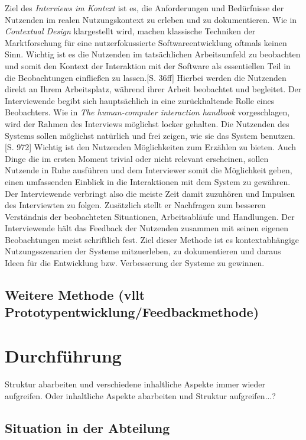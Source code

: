 \documentclass[12pt]{article}
\begin{document}
Ziel des \textit{Interviews im Kontext} ist es, die Anforderungen und
Bedürfnisse der Nutzenden im realen Nutzungskontext zu erleben und zu
dokumentieren. Wie in \textit{Contextual Design} klargestellt wird, machen
klassische Techniken der Marktforschung für eine nutzerfokussierte
Softwareentwicklung oftmals keinen Sinn. Wichtig ist es die Nutzenden im
tatsächlichen Arbeitsumfeld zu beobachten und somit den Kontext der Interaktion
mit der Software als essentiellen Teil in die Beobachtungen einfließen zu
lassen.\cite{contextualDesign}[S. 36ff] Hierbei werden die Nutzenden direkt an
Ihrem Arbeitsplatz, während ihrer Arbeit beobachtet und begleitet. Der
Interviewende begibt sich hauptsächlich in eine zurückhaltende Rolle eines
Beobachters. Wie in \textit{The human-computer interaction handbook}
vorgeschlagen, wird der Rahmen des Interviews möglichst locker gehalten. Die
Nutzenden des Systems sollen möglichst natürlich und frei zeigen, wie sie das
System benutzen.\cite{hciHandbook}[S. 972] Wichtig ist den Nutzenden
Möglichkeiten zum Erzählen zu bieten. Auch Dinge die im ersten Moment trivial
oder nicht relevant erscheinen, sollen Nutzende in Ruhe ausführen und dem
Interviewer somit die Möglichkeit geben, einen umfassenden Einblick in die
Interaktionen mit dem System zu gewähren. Der Interviewende verbringt also die
meiste Zeit damit zuzuhören und Impulsen des Interviewten zu folgen. Zusätzlich
stellt er Nachfragen zum besseren Verständnis der beobachteten Situationen,
Arbeitsabläufe und Handlungen. Der Interviewende hält das Feedback der
Nutzenden zusammen mit seinen eigenen Beobachtungen meist schriftlich fest.
Ziel dieser Methode ist es kontextabhängige Nutzungsszenarien der Systeme
mitzuerleben, zu dokumentieren und daraus Ideen für die Entwicklung bzw.
Verbesserung der Systeme zu gewinnen.

\subsection{Weitere Methode (vllt Prototypentwicklung/Feedbackmethode)}

\section{Durchführung}

Struktur abarbeiten und verschiedene inhaltliche Aspekte immer wieder
aufgreifen. Oder inhaltliche Aspekte abarbeiten und Struktur
aufgreifen...?

\subsection{Situation in der Abteilung}
\end{document}

